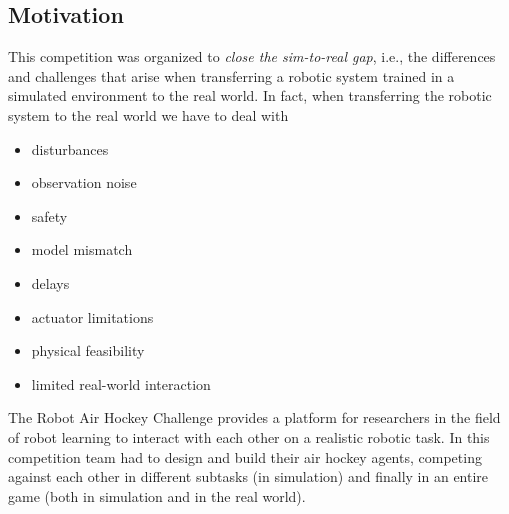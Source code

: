 
\subsection{Motivation}
This competition was organized to \textit{close the sim-to-real gap}, i.e., the differences and challenges that arise
when transferring a robotic system trained in a simulated environment to the real world.
In fact, when transferring the robotic system to the real world we have to deal with
\begin{itemize}
    \item disturbances
    \item observation noise
    \item safety
    \item model mismatch
    \item delays
    \item actuator limitations
    \item physical feasibility
    \item limited real-world interaction
\end{itemize}

The Robot Air Hockey Challenge provides a platform for researchers in the field of robot learning to interact with each
other on a realistic robotic task. In this competition team had to design and build their air hockey agents, competing against
each other in different subtasks (in simulation) and finally in an entire game (both in simulation and in the real world).



